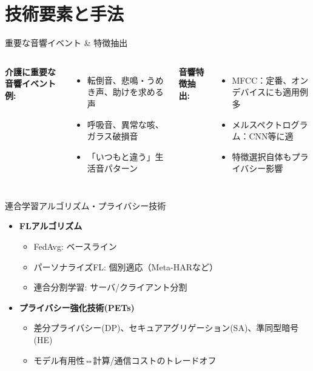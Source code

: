 \documentclass[unicode,12pt,aspectratio=169,dvipdfmx]{beamer}
\begin{document}
\section{技術要素と手法}
\begin{frame}{重要な音響イベント \& 特徴抽出}
  \begin{columns}[T]
      \textbf{介護に重要な音響イベント例:}
      \begin{itemize}
        \item 転倒音、悲鳴・うめき声、助けを求める声
        \item 呼吸音、異常な咳、ガラス破損音
        \item 「いつもと違う」生活音パターン
      \end{itemize}
      \textbf{音響特徴抽出:}
      \begin{itemize}
        \item MFCC：定番、オンデバイスにも適用例多
        \item メルスペクトログラム：CNN等に適
        \item 特徴選択自体もプライバシー影響
      \end{itemize}
  \end{columns}
\end{frame}
\begin{frame}{連合学習アルゴリズム・プライバシー技術}
  \begin{itemize}
    \item \textbf{FLアルゴリズム}
      \begin{itemize}
        \item FedAvg: ベースライン
        \item パーソナライズFL: 個別適応（Meta-HARなど）
        \item 連合分割学習: サーバ/クライアント分割
      \end{itemize}
    \item \textbf{プライバシー強化技術(PETs)}
      \begin{itemize}
        \item 差分プライバシー(DP)、セキュアアグリゲーション(SA)、準同型暗号(HE)
        \item モデル有用性⇔計算/通信コストのトレードオフ
      \end{itemize}
  \end{itemize}
\end{frame}
\end{document}
